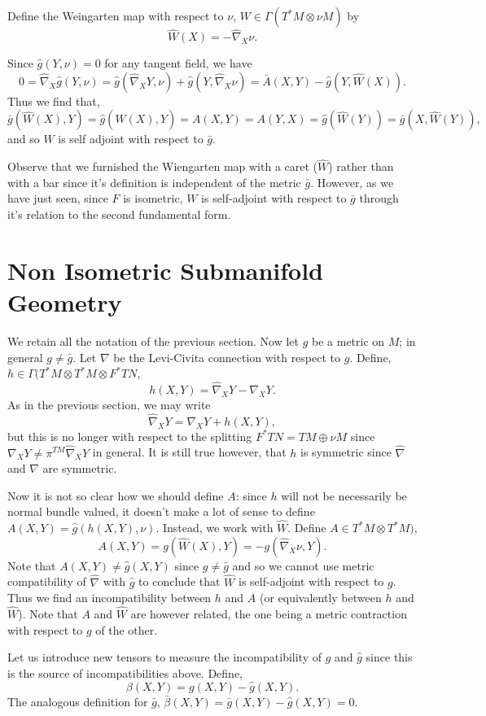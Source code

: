 \documentclass{article}
\begin{document}
Define the Weingarten map with respect to $\nu$, $W \in \Gamma(T^{\ast}M \otimes \nu M)$ by
\[
\hat{W}(X) = - \hat{\nabla}_X \nu.
\]

Since $\hat{g}(Y, \nu) = 0$ for any tangent field, we have
\[
0 = \hat{\nabla}_X \hat{g} (Y, \nu) = \hat{g}(\hat{\nabla}_X Y, \nu) + \hat{g} (Y, \hat{\nabla}_X \nu) = \bar{A}(X, Y) - \hat{g}(Y, \hat{W}(X)).
\]
Thus we find that,
\[
\bar{g} (\hat{W}(X), Y) = \hat{g} (\hat{W}(X), Y) = A(X, Y) = A(Y, X) = \hat{g}(\hat{W}(Y)) = \bar{g}(X, \hat{W}(Y)),
\]
and so $W$ is self adjoint with respect to $\bar{g}$.

Observe that we furnished the Wiengarten map with a caret ($\hat{W}$) rather than with a bar since it's definition is independent of the metric $\bar{g}$. However, as we have just seen, since $F$ is isometric, $W$ is self-adjoint with respect to $\bar{g}$ through it's relation to the second fundamental form. 

\section{Non Isometric Submanifold Geometry}

We retain all the notation of the previous section. Now let $g$ be a metric on $M$; in general $g \ne \bar{g}$. Let $\nabla$ be the Levi-Civita connection with respect to $g$. Define, $h \in \Gamma(T^{\ast} M \otimes T^{\ast}M \otimes F^{\ast}TN$,
\[
h(X, Y) = \hat{\nabla}_X Y - \nabla_X Y.
\]
As in the previous section, we may write
\[
\hat{\nabla}_X Y = \nabla_X Y + h (X, Y),
\]
but this is no longer with respect to the splitting $F^{\ast}TN = TM \oplus \nu M$ since $\nabla_X Y \ne \pi^{TM} \hat{\nabla}_X Y$ in general. It is still true however, that $h$ is symmetric since $\hat{\nabla}$ and $\nabla$ are symmetric.

Now it is not so clear how we should define $A$: since $h$ will not be necessarily be normal bundle valued, it doesn't make a lot of sense to define $A(X, Y) = \hat{g}(h(X, Y), \nu)$. Instead, we work with $\hat{W}$. Define $A \in T^{\ast}M \otimes T^{\ast}M)$,
\[
A (X, Y) = g(\hat{W}(X), Y) = - g(\hat{\nabla}_X \nu, Y).
\]
Note that $A(X, Y) \ne \hat{g} (X, Y)$ since $g \ne \bar{g}$ and so we cannot use metric compatibility of $\hat{\nabla}$ with $\hat{g}$ to conclude that $\hat{W}$ is self-adjoint with respect to $g$. Thus we find an incompatibility between $h$ and $A$ (or equivalently between $h$ and $\hat{W}$). Note that $A$ and $\hat{W}$ are however related, the one being a metric contraction with respect to $g$ of the other.

Let us introduce new tensors to measure the incompatibility of $g$ and $\hat{g}$ since this is the source of incompatibilities above. Define,
\[
\beta(X, Y) = g(X, Y) - \hat{g}(X, Y).
\]
The analogous definition for $\bar{g}$, $\bar{\beta}(X, Y) = \bar{g}(X, Y) - \hat{g}(X, Y) = 0$.
\end{document}
